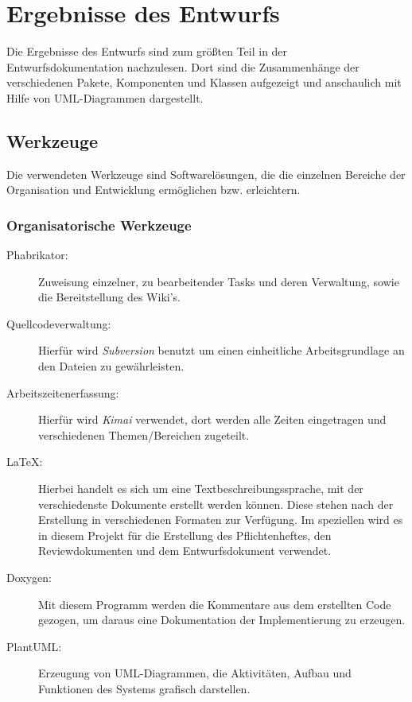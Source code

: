 \section{Ergebnisse des Entwurfs}

Die Ergebnisse des Entwurfs sind zum größten Teil in der Entwurfsdokumentation nachzulesen.
Dort sind die Zusammenhänge der verschiedenen Pakete, Komponenten und Klassen aufgezeigt und anschaulich mit Hilfe von UML-Diagrammen dargestellt.

\subsection{Werkzeuge} 

Die verwendeten Werkzeuge sind Softwarelösungen, die die einzelnen Bereiche der Organisation und Entwicklung ermöglichen bzw. erleichtern.

\subsubsection{Organisatorische Werkzeuge}
	\begin{description}
		\item[Phabrikator:] Zuweisung einzelner, zu bearbeitender Tasks und deren Verwaltung, sowie die Bereitstellung des Wiki's. 
		
		\item[Quellcodeverwaltung:]	Hierfür wird \textit{Subversion} benutzt um einen einheitliche Arbeitsgrundlage an den Dateien zu gewährleisten.
		
		\item[Arbeitszeitenerfassung:] Hierfür wird \textit{Kimai} verwendet, dort werden alle Zeiten eingetragen und verschiedenen Themen/Bereichen zugeteilt.
		
		\item[LaTeX:] Hierbei handelt es sich um eine Textbeschreibungssprache, mit der verschiedenste Dokumente erstellt werden können. 
		Diese stehen nach der Erstellung in verschiedenen Formaten zur Verfügung.
		Im speziellen wird es in diesem Projekt für die Erstellung des Pflichtenheftes, den Reviewdokumenten und dem Entwurfsdokument verwendet.   
		
		\item[Doxygen:] Mit diesem Programm werden die Kommentare aus dem erstellten Code gezogen, um daraus eine Dokumentation der Implementierung zu erzeugen.
		
		\item[PlantUML:] Erzeugung von UML-Diagrammen, die Aktivitäten, Aufbau und Funktionen des Systems grafisch darstellen. 
	\end{description}

